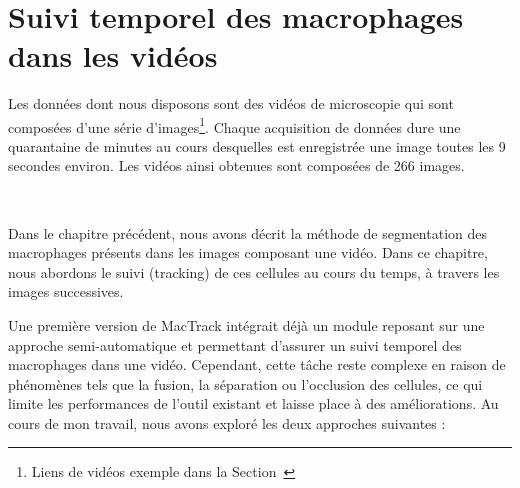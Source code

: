 \documentclass[a4paper,12pt]{report}
\renewcommand{\nameref}[1]{\textbf{\oldnameref{#1}}}
\newcommand{\red}[1]{\textcolor{red}{#1}}
\begin{document}
\




\cleardoublepage
\chapter{Suivi temporel des macrophages dans les vidéos}




Les données dont nous disposons sont des vidéos de microscopie qui sont composées d'une série d'images\footnote{Liens de vidéos exemple dans la Section~\nameref{liens}}. Chaque acquisition de données dure une quarantaine de minutes au cours desquelles est enregistrée une image toutes les 9 secondes environ. Les vidéos ainsi obtenues sont composées de 266 images.

\

Dans le chapitre précédent, nous avons décrit la méthode de segmentation des macrophages présents dans les images composant une vidéo. Dans ce chapitre, nous abordons le suivi (tracking) de ces cellules au cours du temps, à travers les images successives.

Une première version de MacTrack intégrait déjà un module reposant sur une approche semi-automatique et permettant d'assurer un suivi temporel des macrophages dans une vidéo. Cependant, cette tâche reste complexe en raison de phénomènes tels que la fusion, la séparation ou l'occlusion des cellules, ce qui limite les performances de l'outil existant et laisse place à des améliorations. Au cours de mon travail, nous avons exploré les deux approches suivantes :
\end{document}

